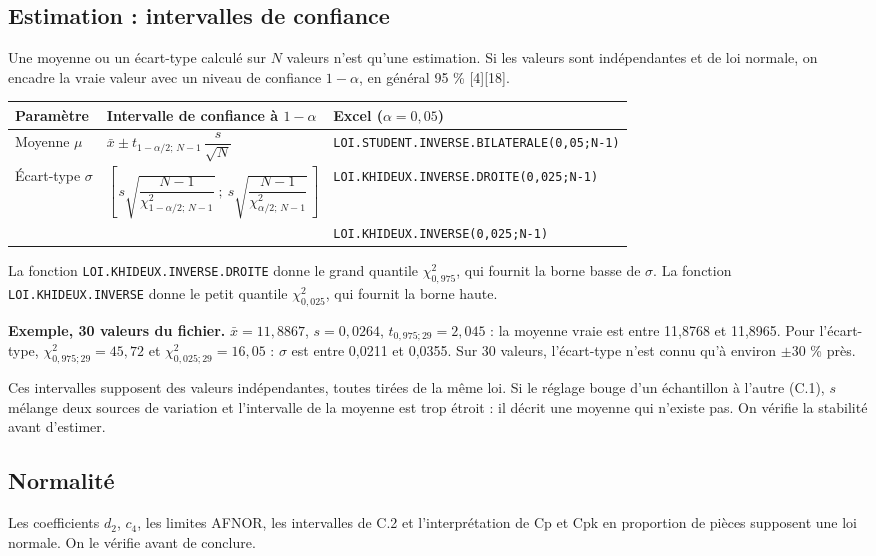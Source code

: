 \documentclass[11pt,a4paper]{article}
\newcommand{\xl}[1]{\texttt{\small #1}}
\begin{document}
\subsection{Estimation : intervalles de confiance}\label{sec:ic}
Une moyenne ou un écart-type calculé sur $N$ valeurs n'est qu'une estimation. Si les valeurs sont indépendantes et de loi normale, on encadre la vraie valeur avec un niveau de confiance $1-\alpha$, en général 95 \% [4][18].

\begin{center}\small
\renewcommand{\arraystretch}{1.7}
\begin{tabularx}{\textwidth}{@{}lXl@{}}\toprule
\textbf{Paramètre} & \textbf{Intervalle de confiance à $1-\alpha$} & \textbf{Excel ($\alpha=0{,}05$)}\\\midrule
Moyenne $\mu$ & $\bar x \pm t_{1-\alpha/2;\,N-1}\,\dfrac{s}{\sqrt N}$ & \xl{LOI.STUDENT.INVERSE.BILATERALE(0,05;N-1)}\\
Écart-type $\sigma$ & $\left[\,s\sqrt{\dfrac{N-1}{\chi^2_{1-\alpha/2;\,N-1}}}\ ;\ s\sqrt{\dfrac{N-1}{\chi^2_{\alpha/2;\,N-1}}}\,\right]$ & \xl{LOI.KHIDEUX.INVERSE.DROITE(0,025;N-1)}\\
 & & \xl{LOI.KHIDEUX.INVERSE(0,025;N-1)}\\\bottomrule
\end{tabularx}
\end{center}
La fonction \xl{LOI.KHIDEUX.INVERSE.DROITE} donne le grand quantile $\chi^2_{0{,}975}$, qui fournit la borne basse de $\sigma$. La fonction \xl{LOI.KHIDEUX.INVERSE} donne le petit quantile $\chi^2_{0{,}025}$, qui fournit la borne haute.

\textbf{Exemple, 30 valeurs du fichier.} $\bar x = 11{,}8867$, $s = 0{,}0264$, $t_{0{,}975;29}=2{,}045$ : la moyenne vraie est entre 11,8768 et 11,8965. Pour l'écart-type, $\chi^2_{0{,}975;29}=45{,}72$ et $\chi^2_{0{,}025;29}=16{,}05$ : $\sigma$ est entre 0,0211 et 0,0355. Sur 30 valeurs, l'écart-type n'est connu qu'à environ $\pm30$ \% près.

\begin{attention}
Ces intervalles supposent des valeurs indépendantes, toutes tirées de la même loi. Si le réglage bouge d'un échantillon à l'autre (C.1), $s$ mélange deux sources de variation et l'intervalle de la moyenne est trop étroit : il décrit une moyenne qui n'existe pas. On vérifie la stabilité avant d'estimer.
\end{attention}

\subsection{Normalité}\label{sec:normalite}
Les coefficients $d_2$, $c_4$, les limites AFNOR, les intervalles de C.2 et l'interprétation de Cp et Cpk en proportion de pièces supposent une loi normale. On le vérifie avant de conclure.
\end{document}
